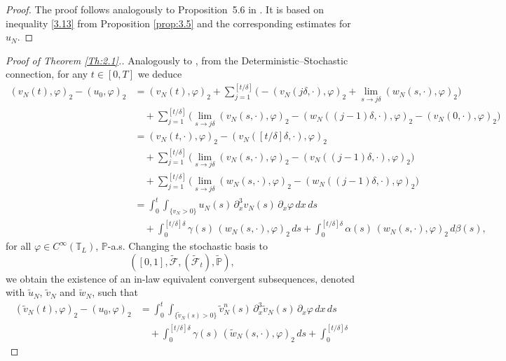 \documentclass[a4paper,12pt]{article}
\numberwithin{equation}{section}
\begin{document}
\medskip

\begin{proof}
The proof follows analogously to Proposition~5.6 in \cite{Gess1}. 
It is based on inequality \eqref{3.13} from Proposition \ref{prop:3.5} and the corresponding estimates for $u_N$.
\end{proof}


\begin{proof}[Proof of Theorem \ref{Th:2.1}.] Analogously to \cite{Gess1}, from the Deterministic--Stochastic connection, for any $t \in [0,T]$ we deduce
\begin{align*}
(v_N(t),\varphi)_2 - (u_0,\varphi)_2
&= (v_N(t),\varphi)_2
+ \sum_{j=1}^{[t/\delta]}
\Big(
- (v_N(j\delta, \cdot),\varphi)_2
+ \lim_{s\to j\delta} (w_N(s, \cdot),\varphi)_2
\Big)
\nonumber\\
&\quad +
\sum_{j=1}^{[t/\delta]}
\Big(
\lim_{s\to j\delta} (v_N(s, \cdot),\varphi)_2
- (w_N((j-1)\delta,\cdot),\varphi)_2
- (v_N(0, \cdot),\varphi)_2
\Big)
\nonumber\\
&= (v_N(t, \cdot),\varphi)_2 - (v_N([t/\delta] \delta, \cdot),\varphi)_2
\nonumber\\
&\quad +
\sum_{j=1}^{[t/\delta]}
\Big(
\lim_{s\to j\delta} (v_N(s, \cdot),\varphi)_2
- (v_N((j-1)\delta, \cdot),\varphi)_2
\Big)
\nonumber\\
&\quad +
\sum_{j=1}^{[t/\delta]}
\Big(
\lim_{s\to j\delta} (w_N(s, \cdot),\varphi)_2
- (w_N((j-1)\delta, \cdot),\varphi)_2
\Big)
\nonumber\\
&= \int_0^t \int_{\{ v_N>0\}}
u_N(s)\, \partial_x^3 v_N(s)\, \partial_x \varphi \, dx\, ds
\nonumber\\
&\quad + \int_0^{[t/\delta] \delta}
\gamma(s)\,(w_N(s, \cdot),\varphi)_2\, ds
+ \int_0^{[t/\delta] \delta}
\alpha(s)\,(w_N(s, \cdot),\varphi)_2\, d\beta(s),
\end{align*}
for all $\varphi \in C^\infty(\mathbb T_L)$, $\mathbb P$-a.s. Changing the stochastic basis to
\[
([0,1], \tilde{\mathcal F}, (\tilde{\mathcal F}_t), \tilde{\mathbb P}),
\]
we obtain the existence of an in-law equivalent convergent subsequences,
denoted with $\tilde u_N$, $\tilde v_N$ and $\tilde w_N$, such that
\begin{align}
(\tilde v_N(t),\varphi)_2 - (u_0,\varphi)_2
&= \int_0^t \int_{\{\tilde v_N(s)>0\}}
\tilde v_N^n(s)\, \partial_x^3 \tilde v_N(s)\, \partial_x \varphi \, dx\, ds
\nonumber\\
&\quad + \int_0^{[t/\delta] \delta}
\gamma(s)\,(\tilde w_N(s, \cdot),\varphi)_2\, ds
+ \int_0^{[t/\delta] \delta}

\end{align}
\end{proof}
\end{document}
